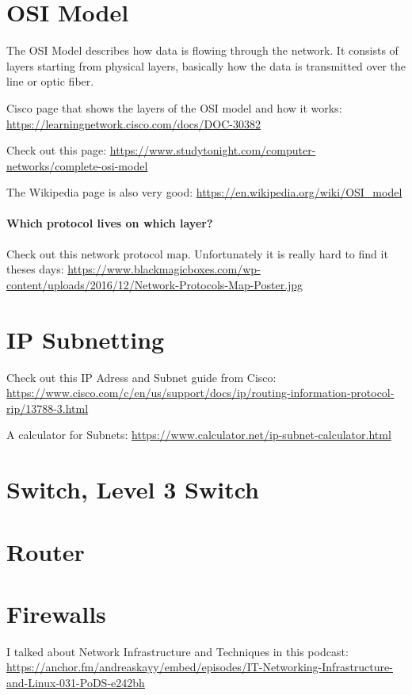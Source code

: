 \documentclass[12pt, numbers=noenddot]{scrreprt} %
\begin{document}
\section{OSI Model}

The OSI Model describes how data is flowing through the network. It consists of layers starting from physical layers, basically how the data is transmitted over the line or optic fiber. 

Cisco page that shows the layers of the OSI model and how it works: \url{https://learningnetwork.cisco.com/docs/DOC-30382}
 
Check out this page: \url{https://www.studytonight.com/computer-networks/complete-osi-model}

The Wikipedia page is also very good: \url{https://en.wikipedia.org/wiki/OSI_model}

\paragraph{Which protocol lives on which layer?} Check out this network protocol map. Unfortunately it is really hard to find it theses days:
\url{https://www.blackmagicboxes.com/wp-content/uploads/2016/12/Network-Protocols-Map-Poster.jpg}

\section{IP Subnetting}

Check out this IP Adress and Subnet guide from Cisco: \url{https://www.cisco.com/c/en/us/support/docs/ip/routing-information-protocol-rip/13788-3.html}

A calculator for Subnets: \url{https://www.calculator.net/ip-subnet-calculator.html}

\section{Switch, Level 3 Switch}

\section{Router}

\section{Firewalls}

I talked about Network Infrastructure and Techniques in this podcast: \url{https://anchor.fm/andreaskayy/embed/episodes/IT-Networking-Infrastructure-and-Linux-031-PoDS-e242bh}
\end{document}
